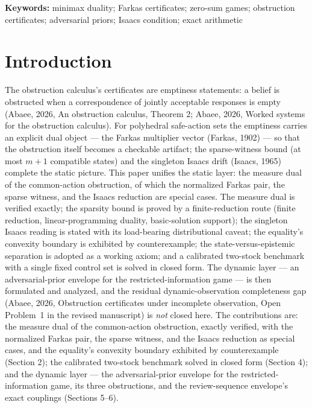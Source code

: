 \documentclass[10pt,twocolumn]{article}
\theoremstyle{definition}
\begin{document}
\vspace{0.4em}
\noindent\textbf{Keywords:} minimax duality; Farkas certificates; zero-sum
games; obstruction certificates; adversarial priors; Isaacs condition;
exact arithmetic

\section{Introduction}

The obstruction calculus's certificates are emptiness statements: a belief is
obstructed when a correspondence of jointly acceptable responses is empty
(Abaee, 2026, An obstruction calculus, Theorem 2; Abaee, 2026, Worked systems for the obstruction calculus). For polyhedral safe-action sets the
emptiness carries an explicit dual object --- the Farkas multiplier vector (Farkas, 1902)
--- so that the obstruction itself becomes a checkable artifact; the
sparse-witness bound (at most $m+1$ compatible states) and the singleton
Isaacs drift (Isaacs, 1965) complete the static picture. This paper unifies the static layer: the measure dual of the common-action obstruction, of which the normalized Farkas pair, the sparse witness, and the Isaacs reduction are special cases. The measure dual is verified exactly; the sparsity bound is proved by a finite-reduction route (finite reduction, linear-programming duality, basic-solution support); the singleton Isaacs reading is stated with its load-bearing distributional caveat; the equality's convexity boundary is exhibited by counterexample; the state-versus-epistemic separation is adopted as a working axiom; and a calibrated two-stock benchmark with a single fixed control set is solved in closed form. The dynamic layer --- an adversarial-prior envelope for the restricted-information game --- is then formulated and analyzed, and the residual dynamic-observation completeness gap (Abaee, 2026, Obstruction certificates under incomplete observation, Open Problem~1 in the revised manuscript) is \emph{not} closed here. The contributions are: the measure dual of the common-action obstruction, exactly verified, with the normalized Farkas pair, the sparse witness, and the Isaacs reduction as special cases, and the equality's convexity boundary exhibited by counterexample (Section 2); the calibrated two-stock benchmark solved in closed form (Section 4); and the dynamic layer --- the adversarial-prior envelope for the restricted-information game, its three obstructions, and the review-sequence envelope's exact couplings (Sections 5--6).
\end{document}
